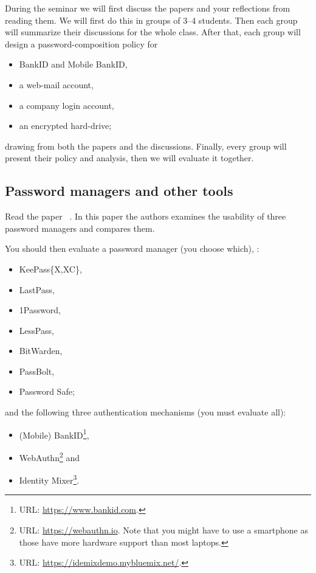 During the seminar we will first discuss the papers and your reflections from 
reading them.
We will first do this in groups of 3--4 students.
Then each group will summarize their discussions for the whole class.
After that, each group will design a password-composition policy for
\begin{itemize}
  \item BankID and Mobile BankID,
  \item a web-mail account,
  \item a company login account,
  \item an encrypted hard-drive;
\end{itemize}
drawing from both the papers and the discussions.
Finally, every group will present their policy and analysis, then we will 
evaluate it together.

\subsection{Password managers and other tools}

Read the paper 
~\cite{UsabilityEvaluationOfPasswordManagers}.
In this paper the authors examines the usability of three password managers and 
compares them.

You should then evaluate a password manager (you choose which), \eg:
\begin{itemize}
  \item KeePass\{X,XC\},
  \item LastPass,
  \item 1Password,
  \item LessPass,
  \item BitWarden,
  \item PassBolt,
  \item Password Safe;
\end{itemize}
and the following three authentication mechanisms (you must evaluate all):
\begin{itemize}
  \item (Mobile) BankID\footnote{%
      URL: \url{https://www.bankid.com}.
    },
  \item WebAuthn\footnote{%
      URL: \url{https://webauthn.io}.
      Note that you might have to use a smartphone as those have more hardware 
      support than most laptops.
    } and
  \item Identity Mixer\footnote{%
      URL: \url{https://idemixdemo.mybluemix.net/}.
    }.
\end{itemize}


